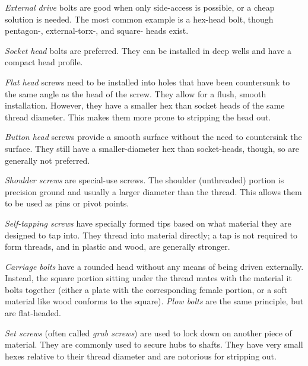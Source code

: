 \documentclass[10pt,letterpaper]{book}
\begin{document}
	\begin{asparaenum}[a)]
		\item \textit{External drive} bolts are good when only side-access is possible, or a cheap solution is needed. The most common example is a hex-head bolt, though pentagon-, external-torx-, and square- heads exist.
		\item \textit{Socket head} bolts are preferred. They can be installed in deep wells and have a compact head profile.
		\item \textit{Flat head} screws need to be installed into holes that have been countersunk to the same angle as the head of the screw. They allow for a flush, smooth installation. However, they have a smaller hex than socket heads of the same thread diameter. This makes them more prone to stripping the head out.
		\item \textit{Button head} screws provide a smooth surface without the need to countersink the surface. They still have a smaller-diameter hex than socket-heads, though, so are generally not preferred.
		\item \textit{Shoulder screws} are special-use screws. The shoulder (unthreaded) portion is precision ground and usually a larger diameter than the thread. This allows them to be used as pins or pivot points.
		\item \textit{Self-tapping screws} have specially formed tips based on what material they are designed to tap into. They thread into material directly; a tap is not required to form threads, and in plastic and wood, are generally stronger.
		\item \textit{Carriage bolts} have a rounded head without any means of being driven externally. Instead, the square portion sitting under the thread mates with the material it bolts together (either a plate with the corresponding female portion, or a soft material like wood conforms to the square). \textit{Plow bolts} are the same principle, but are flat-headed.
		\item \textit{Set screws} (often called \textit{grub screws}) are used to lock down on another piece of material. They are commonly used to secure hubs to shafts. They have very small hexes relative to their thread diameter and are notorious for stripping out.
	\end{asparaenum}
	
\end{document}
